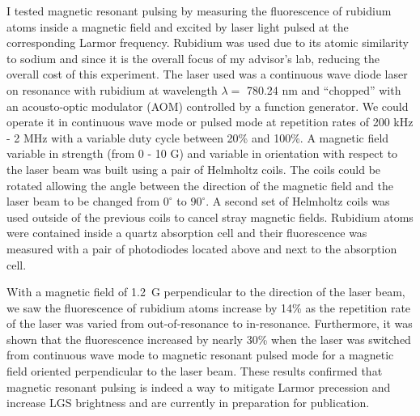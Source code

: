 \documentclass[]{article}
\begin{document}
I tested magnetic resonant pulsing by measuring the fluorescence of rubidium atoms inside a magnetic field and excited by laser light pulsed at the corresponding Larmor frequency. Rubidium was used due to its atomic similarity to sodium and since it is the overall focus of my advisor's lab, reducing the overall cost of this experiment. The laser used was a continuous wave diode laser on resonance with rubidium at wavelength $\lambda =$ 780.24 nm and ``chopped'' with an acousto-optic modulator (AOM) controlled by a function generator. We could operate it in continuous wave mode or pulsed mode at repetition rates of 200 kHz - 2 MHz with a variable duty cycle between 20\% and 100\%. A magnetic field variable in strength (from 0 - 10 G) and variable in orientation with respect to the laser beam was built using a pair of Helmholtz coils. The coils could be rotated allowing the angle between the direction of the magnetic field and the laser beam to be changed from $0^{\circ}$ to $90^{\circ}$. A second set of Helmholtz coils was used outside of the previous coils to cancel stray magnetic fields. Rubidium atoms were contained inside a quartz absorption cell and their fluorescence was measured with a pair of photodiodes located above and next to the absorption cell.

With a magnetic field of \SI{1.2}{ G} perpendicular to the direction of the laser beam, we saw the fluorescence of rubidium atoms increase by 14\% as the repetition rate of the laser was varied from out-of-resonance to in-resonance. Furthermore, it was shown that the fluorescence increased by nearly 30\% when the laser was switched from continuous wave mode to magnetic resonant pulsed mode for a magnetic field oriented perpendicular to the laser beam. These results confirmed that magnetic resonant pulsing is indeed a way to mitigate Larmor precession and increase LGS brightness and are currently in preparation for publication.

\newpage


\end{document}
